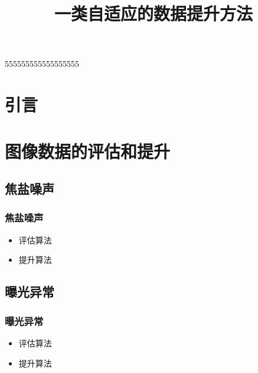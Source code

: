555555555555555555\documentclass{beamer}
\title{一类自适应的数据提升方法}
\author{}
\date{}
\begin{document}
\maketitle

\section{引言}

\section{图像数据的评估和提升}

\subsection{焦盐噪声}
\begin{frame}
  \frametitle{焦盐噪声}
  \begin{itemize}
  \item 评估算法
  \item 提升算法
  \end{itemize}

  
\end{frame}




\subsection{曝光异常}
\begin{frame}
  \frametitle{曝光异常}
  \begin{itemize}
  \item 评估算法
  \item 提升算法
  \end{itemize}


\end{frame}
\end{document}

